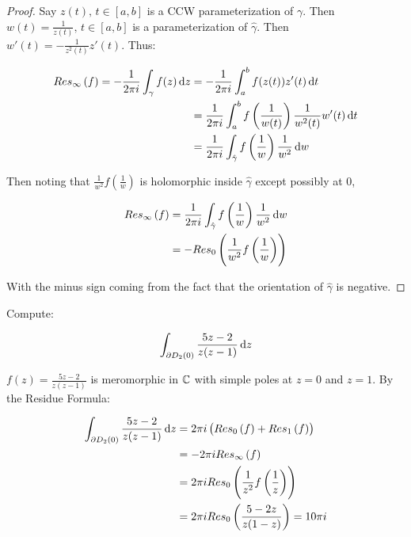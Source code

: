 \begin{proof}
Say $z(t), \, t \in [a,b]$ is a CCW parameterization of $\gamma$. Then $w(t) = \frac{1}{z(t)}, \, t \in [a,b]$ is a parameterization of $\hat{\gamma}$. Then $w'(t) =- \frac{1}{z^2(t)} z'(t)$. Thus:

\begin{align*}
    \res{\infty}{f} = - \frac{1}{2 \pi i} \int_\gamma f(z) \dif z &= - \frac{1}{2 \pi i} \int_a^b f(z(t)) z'(t) \dif t\\
    &= \frac{1}{2 \pi i} \int_a^b f  \left( \frac{1}{w(t)} \right) \frac{1}{w^2(t)} w'(t) \dif t\\
    &= \frac{1}{2 \pi i} \int_{\hat{\gamma}} f \left( \frac{1}{w} \right) \frac{1}{w^2} \dif w
\end{align*}

Then noting that $\frac{1}{w^2} f \left( \frac{1}{w} \right)$ is holomorphic inside $\hat{\gamma}$ except possibly at $0$,

\begin{align*}
    \res{\infty}{f} &= \frac{1}{2 \pi i} \int_{\hat{\gamma}} f \left( \frac{1}{w} \right) \frac{1}{w^2} \dif w\\
    &= - \res{0}{\frac{1}{w^2} f \left( \frac{1}{w} \right)}
\end{align*}

With the minus sign coming from the fact that the orientation of $\hat{\gamma}$ is negative.


\end{proof}


\begin{example}

Compute:

\begin{align*}
    \int_{\partial D_2(0)} \frac{5z-2}{z(z-1)} \dif z
\end{align*}

$f(z) = \frac{5z-2}{z(z-1)}$ is meromorphic in $\mathbb{C}$ with simple poles at $z=0$ and $z=1$. By the Residue Formula:

\begin{align*}
    \int_{\partial D_2(0)} \frac{5z-2}{z(z-1)} \dif z &= 2 \pi i \left( \res{0}{f} + \res{1}{f} \right)\\
    &= - 2 \pi i \res{\infty }{f}\\
    &= 2 \pi i \res{0}{\frac{1}{z^2} f\left( \frac{1}{z} \right)}\\
    &= 2 \pi i \res{0}{\frac{5-2z}{z(1-z)}} = 10 \pi i
\end{align*}
\end{example}


